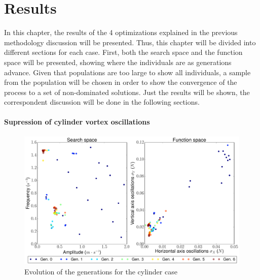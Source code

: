 \chapter{Results}

In this chapter, the results of the 4 optimizations explained in the previous methodology discussion will be presented. Thus, this chapter will be divided into different sections for each case. First, both the search space and the function space will be presented, showing where the individuals are as generations advance. Given that populations are too large to show all individuals, a sample from the population will be chosen in order to show the convergence of the process to a set of non-dominated solutions. Just the results will be shown, the correspondent discussion will be done in the following sections.

\newpage

\subsubsection*{Supression of cylinder vortex oscillations}

     \begin{figure}[h!]
        \centering
        \small
        \includegraphics[width=\textwidth, height=0.35\textheight]{Figures/4/gen6.pdf}
        \caption{Evolution of the generations for the cylinder case}
        \label{fig:genForCylinder}
    \end{figure}
    
